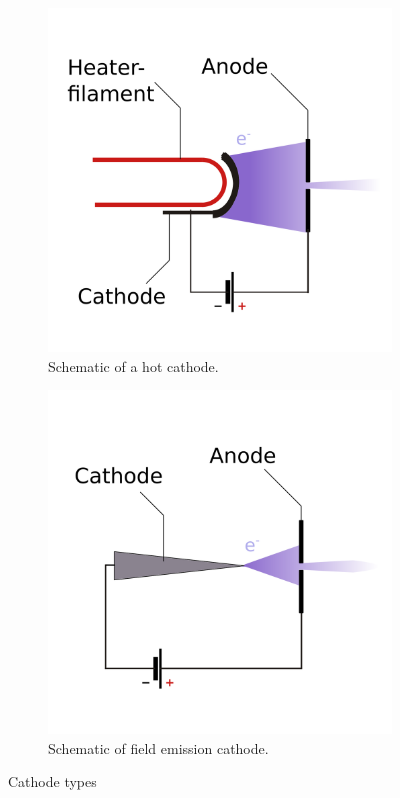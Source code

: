 \begin{figure}
	\centering
	\begin{subfigure}{0.4\textwidth}
		\centering
		\includegraphics[width=\textwidth]{Chapters/CRT-Basics/HotCathode}
		\caption{Schematic of a hot cathode.}
		\label{fig:hotcathode}
	\end{subfigure}%
	\hspace{0.1\textwidth}
	\begin{subfigure}{0.4\textwidth}
		\centering
		\includegraphics[width=\textwidth]{Chapters/CRT-Basics/ColdCathode}
		
		\caption{Schematic of field emission cathode.}
		\label{fig:coldcathode}
	\end{subfigure}
	\caption{Cathode types}
	\label{fig:cathodes}
\end{figure}


